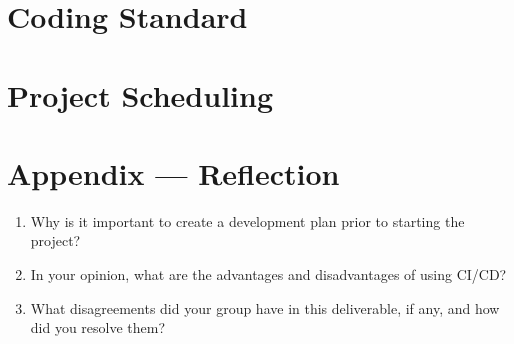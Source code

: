 \documentclass{article}
\begin{document}
\section{Coding Standard}

\section{Project Scheduling}


\newpage{}

\section*{Appendix --- Reflection}




\begin{enumerate}
    \item Why is it important to create a development plan prior to starting the
    project?
    \item In your opinion, what are the advantages and disadvantages of using
    CI/CD?
    \item What disagreements did your group have in this deliverable, if any,
    and how did you resolve them?
\end{enumerate}
\end{document}
